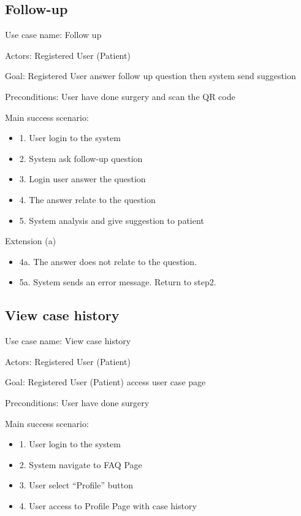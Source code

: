 \documentclass[12pt,oneside,openright,a4paper]{cpe-english-project}
\begin{document}
      \subsection{Follow-up}
        \qquad Use case name: Follow up \par
        \qquad Actors: Registered User (Patient) \par
        \qquad Goal: Registered User answer follow up question then system send suggestion \par
        \qquad Preconditions: User have done surgery and scan the QR code \par
        \qquad Main success scenario:
        \begin{itemize}
          \item[] 1. User login to the system
          \item[] 2. System ask follow-up question
          \item[] 3. Login user answer the question
          \item[] 4. The answer relate to the question
          \item[] 5. System analysis and give suggestion to patient
        \end{itemize}
        \qquad Extension (a)
        \begin{itemize}
          \item[] 4a. The answer does not relate to the question.
          \item[] 5a. System sends an error message. Return to step2.
        \end{itemize}

      \subsection{View case history}
        \qquad Use case name: View case history \par
        \qquad Actors: Registered User (Patient) \par
        \qquad Goal: Registered User (Patient) access user case page \par
        \qquad Preconditions: User have done surgery \par
        \qquad Main success scenario:
        \begin{itemize}
          \item[] 1. User login to the system
          \item[] 2. System navigate to FAQ Page
          \item[] 3. User select “Profile” button
          \item[] 4. User access to Profile Page with case history
        \end{itemize}
\end{document}
